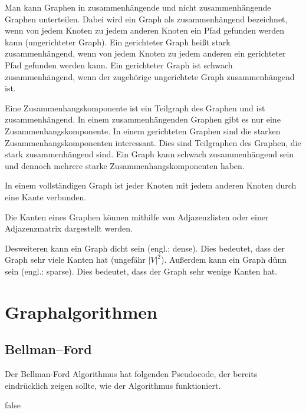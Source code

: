\documentclass[10pt,a4paper,oneside,ngerman,numbers=noenddot]{scrartcl}
\begin{document}
	Man kann Graphen in zusammenhängende und nicht zusammenhängende Graphen unterteilen. Dabei wird ein Graph als zusammenhängend bezeichnet, wenn von jedem Knoten zu jedem anderen Knoten ein Pfad gefunden werden kann (ungerichteter Graph). Ein gerichteter Graph heißt stark zusammenhängend, wenn von jedem Knoten zu jedem anderen ein gerichteter Pfad gefunden werden kann. Ein gerichteter Graph ist schwach zusammenhängend, wenn der zugehörige ungerichtete Graph zusammenhängend ist.
	
	Eine Zusammenhangskomponente ist ein Teilgraph des Graphen und ist zusammenhängend. In einem zusammenhängenden Graphen gibt es nur eine Zusammenhangskomponente. In einem gerichteten Graphen sind die starken Zusammenhangskomponenten interessant. Dies sind Teilgraphen des Graphen, die stark zusammenhängend sind. Ein Graph kann schwach zusammenhängend sein und dennoch mehrere starke Zusammenhangskomponenten haben.
	
	In einem vollständigen Graph ist jeder Knoten mit jedem anderen Knoten durch eine Kante verbunden.
	
	Die Kanten eines Graphen können mithilfe von Adjazenzlisten oder einer Adjazenzmatrix dargestellt werden.
	
	Desweiteren kann ein Graph dicht sein (engl.: dense). Dies bedeutet, dass der Graph sehr viele Kanten hat (ungefähr $|V|^{2}$). Außerdem kann ein Graph dünn sein (engl.: sparse). Dies bedeutet, dass der Graph sehr wenige Kanten hat.
	
\section{Graphalgorithmen}

	\subsection{Bellman--Ford}
	
		Der Bellman-Ford Algorithmus hat folgenden Pseudocode, der bereits eindrücklich zeigen sollte, wie der Algorithmus funktioniert.
		
		\begin{algorithmic}[1]
				\State {}
						\State {}
					\EndFor
				\EndFor
					 
						\State \Return false
					\EndIf
				\EndFor
			\EndFunction
		\end{algorithmic}
		
\end{document}
